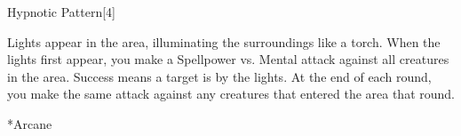 \begin{spellsection}{Hypnotic Pattern}[4]
    \begin{spellheader}
    \end{spellheader}
    \begin{spellcontent}
        \begin{spelltargetinginfo}
        \end{spelltargetinginfo}
        \begin{spelleffects}
            \spelleffect Lights appear in the area, illuminating the surroundings like a torch.
            When the lights first appear, you make a Spellpower vs. Mental attack against all creatures in the area.
            Success means a target is \fascinated by the lights.
            At the end of each round, you make the same attack against any creatures that entered the area that round.
            \spelldur \durshort
        \end{spelleffects}
    \end{spellcontent}
    \begin{spellfooter}
        *{Arcane}
        \miscastyou
    \end{spellfooter}
    \begin{spellaugments}
    \end{spellaugments}
\end{spellsection}


